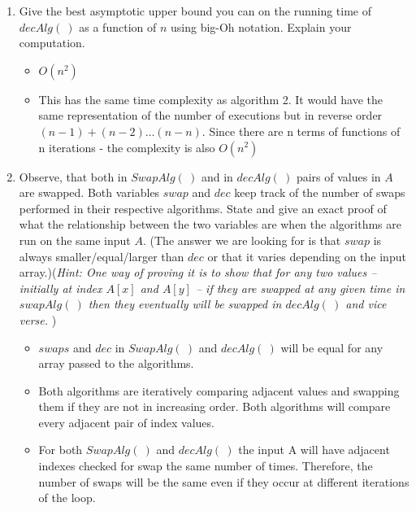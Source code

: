 \documentclass[11pt]{article}
\begin{document}
\begin{enumerate}
\begin{enumerate}
\begin{enumerate}
        \item Give the best asymptotic upper bound you can on the running time of $decAlg(\ )$ as a function of $n$ using big-Oh notation. Explain your computation.
            \begin{itemize}
                \color{teal}
                \item $O\left(n^2\right) $
                \item This has the same time complexity as algorithm 2. It would have the same representation of the number of executions but in reverse order $ (n-1) + (n-2) \ldots (n-n)$. Since there are n terms of functions of n iterations - the complexity is also $O(n^2)$
            \end{itemize}

        \item Observe, that both in $SwapAlg(\ )$ and  in $decAlg(\ )$ pairs of values in $A$ are swapped. Both variables $swap$ and $dec$ keep track of the number of swaps performed in their respective algorithms. State and give an exact proof of what the relationship between the two variables are when the algorithms are run on the same input $A$. (The answer we are looking for is that $swap$ is always smaller/equal/larger than $dec$ or that it varies depending on the input array.)(\emph{Hint: One way of proving it is to show that for any two values -- initially at index $A[x]$ and $A[y]$ --  if they are swapped at any given time in $swapAlg(\ )$ then they eventually will be swapped in $decAlg(\ )$ and vice verse. })
            
            \begin{itemize}
                \color {teal}
                \item $swaps$ and $dec$ in $SwapAlg\left(\  \right)$ and $decAlg\left( \  \right)$ will be equal for any array passed to the algorithms. 
                \item Both algorithms are iteratively comparing adjacent values and swapping them if they are not in increasing order. Both algorithms will compare every adjacent pair of index values. 
                \item For both $SwapAlg\left( \  \right) $ and $decAlg\left( \  \right) $ the input A will have adjacent indexes checked for swap the same number of times. Therefore, the number of swaps will be the same even if they occur at different iterations of the loop.
            \end{itemize}

    \end{enumerate}
 

\end{enumerate}
\end{enumerate}
\end{document}
